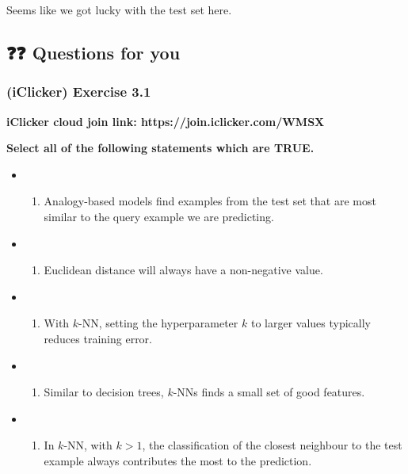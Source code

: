 \documentclass[11pt]{article}
\providecommand{\tightlist}{%
      \setlength{\itemsep}{0pt}\setlength{\parskip}{0pt}}
\begin{document}
    Seems like we got lucky with the test set here.

    

    \subsection{❓❓ Questions for you}\label{questions-for-you}

    \subsubsection{(iClicker) Exercise 3.1}\label{iclicker-exercise-3.1}

\textbf{iClicker cloud join link: https://join.iclicker.com/WMSX}

\textbf{Select all of the following statements which are TRUE.}

\begin{itemize}
\tightlist
\item
  \begin{enumerate}
  \def\labelenumi{(\Alph{enumi})}
  \tightlist
  \item
    Analogy-based models find examples from the test set that are most
    similar to the query example we are predicting.
  \end{enumerate}
\item
  \begin{enumerate}
  \def\labelenumi{(\Alph{enumi})}
  \setcounter{enumi}{1}
  \tightlist
  \item
    Euclidean distance will always have a non-negative value.
  \end{enumerate}
\item
  \begin{enumerate}
  \def\labelenumi{(\Alph{enumi})}
  \setcounter{enumi}{2}
  \tightlist
  \item
    With \(k\)-NN, setting the hyperparameter \(k\) to larger values
    typically reduces training error.
  \end{enumerate}
\item
  \begin{enumerate}
  \def\labelenumi{(\Alph{enumi})}
  \setcounter{enumi}{3}
  \tightlist
  \item
    Similar to decision trees, \(k\)-NNs finds a small set of good
    features.
  \end{enumerate}
\item
  \begin{enumerate}
  \def\labelenumi{(\Alph{enumi})}
  \setcounter{enumi}{4}
  \tightlist
  \item
    In \(k\)-NN, with \(k > 1\), the classification of the closest
    neighbour to the test example always contributes the most to the
    prediction.
  \end{enumerate}
\end{itemize}
\end{document}
